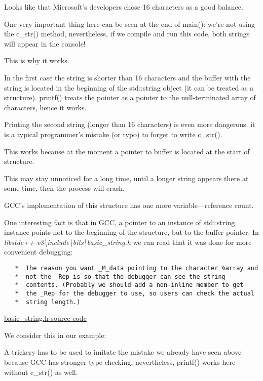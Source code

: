 Looks like that Microsoft's developers chose 16 characters as a good balance.

One very important thing here can be seen at the end of main(): we're not using the c\_str() method, nevertheless,
if we compile and run this code, both strings will appear in the console!

This is why it works.

In the first case the string is shorter than 16 characters and the buffer with the string is located in the
beginning of the std::string object (it can be treated as a structure).
printf() treats the pointer as a pointer to the null-terminated 
array of characters, hence it works.

Printing the second string (longer than 16 characters) is even more dangerous: it is a typical programmer's mistake
(or typo) to forget to write c\_str().

This works because at the moment a pointer to buffer is located at the start of structure.

This may stay unnoticed for a long time, until a longer string appears there at some time, 
then the process will crash.


GCC's implementation of this structure has one more variable---reference count.

One interesting fact is that in GCC, a pointer to an instance of std::string instance points not to
the beginning of the structure, but to the buffer pointer.
In \emph{libstdc++-v3\textbackslash{}include\textbackslash{}bits\textbackslash{}basic\_string.h}
we can read that it was done for more convenient debugging:

\begin{lstlisting}
   *  The reason you want _M_data pointing to the character %array and
   *  not the _Rep is so that the debugger can see the string
   *  contents. (Probably we should add a non-inline member to get
   *  the _Rep for the debugger to use, so users can check the actual
   *  string length.)
\end{lstlisting}

\href{http://go.yurichev.com/17085}{basic\_string.h source code}

We consider this in our example:



A trickery has to be used to imitate the mistake we already have seen above because GCC
has stronger type checking, nevertheless, printf() works here without c\_str() as well.

